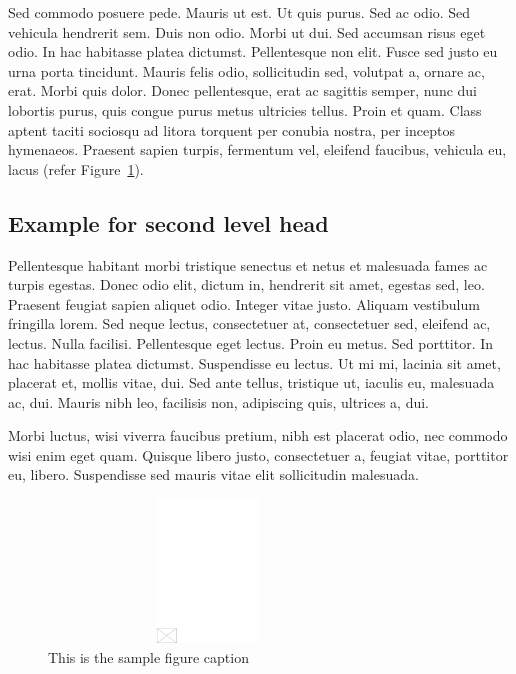 \documentclass[CJCE,STIX2COL]{WileyNJD-v2}
\begin{document}
Sed commodo posuere pede. Mauris ut est. Ut quis purus. Sed ac odio. Sed vehicula hendrerit sem. Duis non
odio. Morbi ut dui. Sed accumsan risus eget odio. In hac habitasse platea dictumst. Pellentesque non elit. Fusce
sed justo eu urna porta tincidunt. Mauris felis odio, sollicitudin sed, volutpat a, ornare ac, erat. Morbi quis dolor.
Donec pellentesque, erat ac sagittis semper, nunc dui lobortis purus, quis congue purus metus ultricies tellus. Proin
et quam. Class aptent taciti sociosqu ad litora torquent per conubia nostra, per inceptos hymenaeos. Praesent sapien
turpis, fermentum vel, eleifend faucibus, vehicula eu, lacus (refer Figure~\ref{fig2}).

\subsection{Example for second level head}

Pellentesque habitant morbi tristique senectus et netus et malesuada fames ac turpis egestas. Donec odio elit, dictum
in, hendrerit sit amet, egestas sed, leo. Praesent feugiat sapien aliquet odio. Integer vitae justo. Aliquam vestibulum
fringilla lorem. Sed neque lectus, consectetuer at, consectetuer sed, eleifend ac, lectus. Nulla facilisi. Pellentesque
eget lectus. Proin eu metus. Sed porttitor. In hac habitasse platea dictumst. Suspendisse eu lectus. Ut mi mi, lacinia
sit amet, placerat et, mollis vitae, dui. Sed ante tellus, tristique ut, iaculis eu, malesuada ac, dui. Mauris nibh leo,
facilisis non, adipiscing quis, ultrices a, dui.

Morbi luctus, wisi viverra faucibus pretium, nibh est placerat odio, nec commodo wisi enim eget quam. Quisque
libero justo, consectetuer a, feugiat vitae, porttitor eu, libero. Suspendisse sed mauris vitae elit sollicitudin malesuada.

\begin{figure}[t]
\centerline{\includegraphics[width=240pt,height=9pc,draft]{empty}}
\caption{This is the sample figure caption\label{fig2}}
\end{figure}
\end{document}
